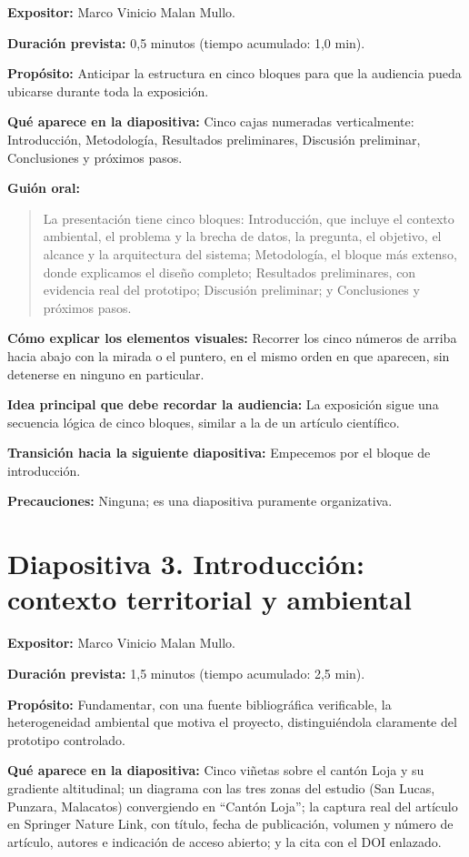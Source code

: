 \documentclass[11pt,a4paper]{article}
\newcommand{\campo}[2]{\par\medskip\noindent\textbf{#1:} #2\par}
\newenvironment{guionoral}{%
  \medskip\noindent\textbf{Gui\'on oral:}\par\smallskip
  \begin{quote}\small
}{%
  \end{quote}
}
\newcommand{\separadordiapositiva}{\bigskip\noindent{\color{Tierra!60}\hrulefill}\bigskip}
\begin{document}
\campo{Expositor}{Marco Vinicio Malan Mullo.}
\campo{Duraci\'on prevista}{0,5 minutos (tiempo acumulado: 1,0 min).}
\campo{Prop\'osito}{Anticipar la estructura en cinco bloques para que
la audiencia pueda ubicarse durante toda la exposici\'on.}
\campo{Qu\'e aparece en la diapositiva}{Cinco cajas numeradas
verticalmente: Introducci\'on, Metodolog\'ia, Resultados preliminares,
Discusi\'on preliminar, Conclusiones y pr\'oximos pasos.}

\begin{guionoral}
La presentaci\'on tiene cinco bloques: Introducci\'on, que incluye el
contexto ambiental, el problema y la brecha de datos, la pregunta, el
objetivo, el alcance y la arquitectura del sistema; Metodolog\'ia, el
bloque m\'as extenso, donde explicamos el dise\~no completo;
Resultados preliminares, con evidencia real del prototipo; Discusi\'on
preliminar; y Conclusiones y pr\'oximos pasos.
\end{guionoral}

\campo{C\'omo explicar los elementos visuales}{Recorrer los cinco
n\'umeros de arriba hacia abajo con la mirada o el puntero, en el mismo
orden en que aparecen, sin detenerse en ninguno en particular.}
\campo{Idea principal que debe recordar la audiencia}{La exposici\'on
sigue una secuencia l\'ogica de cinco bloques, similar a la de un
art\'iculo cient\'ifico.}
\campo{Transici\'on hacia la siguiente diapositiva}{Empecemos por el
bloque de introducci\'on.}
\campo{Precauciones}{Ninguna; es una diapositiva puramente
organizativa.}

\separadordiapositiva

\section*{Diapositiva 3. Introducci\'on: contexto territorial y ambiental}

\campo{Expositor}{Marco Vinicio Malan Mullo.}
\campo{Duraci\'on prevista}{1,5 minutos (tiempo acumulado: 2,5 min).}
\campo{Prop\'osito}{Fundamentar, con una fuente bibliogr\'afica
verificable, la heterogeneidad ambiental que motiva el proyecto,
distingui\'endola claramente del prototipo controlado.}
\campo{Qu\'e aparece en la diapositiva}{Cinco vi\~netas sobre el
cant\'on Loja y su gradiente altitudinal; un diagrama con las tres
zonas del estudio (San Lucas, Punzara, Malacatos) convergiendo en
``Cant\'on Loja''; la captura real del art\'iculo en Springer Nature
Link, con t\'itulo, fecha de publicaci\'on, volumen y n\'umero de
art\'iculo, autores e indicaci\'on de acceso abierto; y la cita con el
DOI enlazado.}
\end{document}
